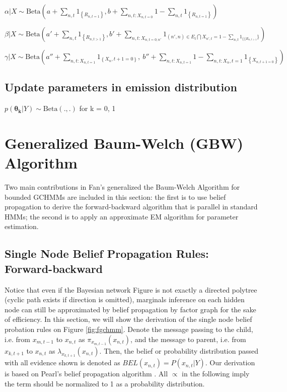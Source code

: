 \documentclass{article} %
\begin{document}
$\alpha | X \sim \text{Beta}( a + \sum_{n,t}1_{\left \{ R_{n, t=1} \right \}},b+ \sum_{n,t:X_{n,t=0}}1- \sum_{n,t}1_{\left \{ R_{n,t=1} \right \}})$

$\beta | X \sim \text{Beta}({a}' + \sum_{n,t}1_{\left \{R_{n,t >1}\right \}}, {b}' + \sum_{n,t:X_{n,t=0;n'}}1_{(n',n) \in E_{t} \bigcap X_{n', t} =1  - \sum_{n,t}1_{\{ \{ R_{n,t>1}} \}})$

$\gamma| X \sim \text{Beta}(a'' + \sum_{n,t:X_{n,t=1}}1_{\left \{ X_n,t+1=0 \right \}},\ b''+ \sum_{n,t:X_{n,t=1}}1 -\sum_{n,t:X_n,t=1}
1_{\left \{ X_{n,t+1=0} \right \}})$

\subsection{Update parameters in emission distribution}
$p(\boldsymbol{\theta_k}| Y) \sim \text{Beta}(., . )$ for k = 0, 1

\section{Generalized Baum-Welch (GBW) Algorithm}

Two main contributions in Fan's generalized the Baum-Welch Algorithm for bounded GCHMMs are included in this section: the first is to use belief propagation to derive the forward-backward algorithm that is parallel in standard HMMs; the second is to apply an approximate EM algorithm for parameter estimation. 

\subsection{Single Node Belief Propagation Rules: Forward-backward}
Notice that even if the Bayesian network Figure is not exactly a directed polytree (cyclic path exists if direction is omitted), marginals inference on each hidden node can still be approximated by belief propagation by factor graph for the sake of efficiency. In this section, we will show the derivation of the single node belief probation rules on Figure \ref{fig:fgchmm}. Denote the message passing to the child, i.e. from $x_{m,t-1}$ to $x_{n,t}$ as $\pi_{x_{m,t-1}}(x_{n,t})$, and the message to parent, i.e. from $x_{k,t+1}$ to $x_{n,t}$ as $\lambda_{x_{k,t+1}}(x_{n,t})$. Then, the belief or probability distribution passed with all evidence shown is denoted as $BEL(x_{n,t})=P(x_{n,t}|Y)$. Our derivation is based on Pearl's belief propagation algorithm \cite{pearl1988probabilistic}. All $\propto$ in the following imply the term should be normalized to 1 as a probability distribution.
\end{document}
